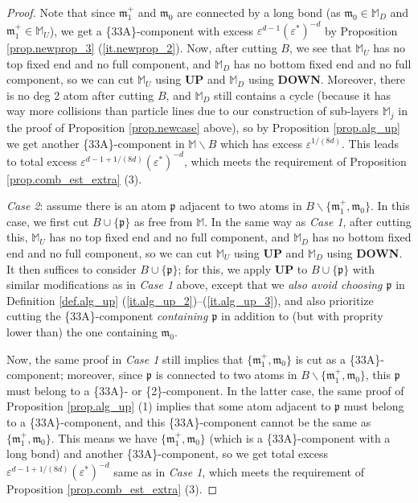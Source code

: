 \documentclass[10pt, reqno]{amsart}
\newcommand{\Mb}{\mathbb M}
\newcommand{\mf}{\mathfrak m}
\newcommand{\pf}{\mathfrak p}
\theoremstyle{definition}
\theoremstyle{remark}
\numberwithin{equation}{section}
\begin{document}
\begin{proof}
Note that since $\mf_1^+$ and $\mf_0$ are connected by a long bond (as $\mf_0\in\Mb_D$ and $\mf_1^+\in \Mb_U$), we get a \{33A\}-component with excess $\varepsilon^{d-1}(\varepsilon^*)^{-d}$ by Proposition \ref{prop.newprop_3} (\ref{it.newprop_2}). Now, after cutting $B$, we see that $\Mb_U$ has no top fixed end and no full component, and $\Mb_D$ has no bottom fixed end and no full component, so we can cut $\Mb_U$ using \textbf{UP} and $\Mb_D$ using \textbf{DOWN}. Moreover, there is no deg 2 atom after cutting $B$, and $\Mb_D$ still contains a cycle (because it has way more collisions than particle lines due to our construction of sub-layers $\Mb_j$ in the proof of Proposition \ref{prop.newcase} above), so by Proposition \ref{prop.alg_up} we get another \{33A\}-component in $\Mb\backslash B$ which has excess $\varepsilon^{1/(8d)}$. This leads to total excess $\varepsilon^{d-1+1/(8d)}(\varepsilon^*)^{-d}$, which meets the requirement of Proposition \ref{prop.comb_est_extra} (3).

\emph{Case 2}: assume there is an atom $\pf$ adjacent to two atoms in $B\backslash\{\mf_1^+,\mf_0\}$. In this case, we first cut $B\cup\{\pf\}$ as free from $\Mb$. In the same way as \emph{Case 1}, after cutting this, $\Mb_U$ has no top fixed end and no full component, and $\Mb_D$ has no bottom fixed end and no full component, so we can cut $\Mb_U$ using \textbf{UP} and $\Mb_D$ using \textbf{DOWN}. It then suffices to consider $B\cup\{\pf\}$; for this, we apply \textbf{UP} to $B\cup\{\pf\}$ with similar modifications as in \emph{Case 1} above, except that we \emph{also avoid choosing $\pf$} in Definition \ref{def.alg_up} (\ref{it.alg_up_2})--(\ref{it.alg_up_3}), and also prioritize cutting the \{33A\}-component \emph{containing $\pf$} in addition to (but with proprity lower than) the one containing $\mf_0$. 

Now, the same proof in \emph{Case 1} still implies that $\{\mf_1^+,\mf_0\}$ is cut as a \{33A\}-component; moreover, since $\pf$ is connected to two atoms in $B\backslash\{\mf_1^+,\mf_0\}$, this $\pf$ must belong to a \{33A\}- or \{2\}-component. In the latter case, the same proof of Proposition \ref{prop.alg_up} (1) implies that some atom adjacent to $\pf$ must belong to a \{33A\}-component, and this \{33A\}-component cannot be the same as $\{\mf_1^+,\mf_0\}$. This means we have $\{\mf_1^+,\mf_0\}$ (which is a \{33A\}-component with a long bond) and another \{33A\}-component, so we get total excess $\varepsilon^{d-1+1/(8d)}(\varepsilon^*)^{-d}$ same as in \emph{Case 1}, which meets the requirement of Proposition \ref{prop.comb_est_extra} (3).


\end{proof}
\end{document}
